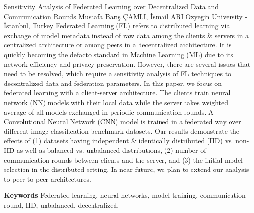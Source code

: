 
    \begin{abstract_online}{Sensitivity Analysis of Federated Learning over Decentralized Data and Communication Rounds}{%
        Mustafa Barış ÇAMLI, İsmail ARI}{%
        }{%
        Ozyegin University - İstanbul, Turkey}
    Federated Learning (FL) refers to distributed learning via exchange of model metadata instead of raw data among the clients & servers in a centralized architecture or among peers in a decentralized architecture. It is quickly becoming the defacto standard in Machine Learning (ML) due to its network efficiency and privacy-preservation. However, there are several issues that need to be resolved, which require a sensitivity analysis of FL techniques to decentralized data and federation parameters. In this paper, we focus on federated learning with a client-server architecture. The clients train neural network (NN) models with their local data while the server takes weighted average of all models exchanged in periodic communication rounds. A Convolutional Neural Network (CNN) model is trained in a federated way over different image classification benchmark datasets. Our results demonstrate the effects of (1) datasets having independent & identically distributed (IID) vs. non-IID as well as balanced vs. unbalanced distributions, (2) number of communication rounds between clients and the server, and (3) the initial model selection in the distributed setting. In near future, we plan to extend our analysis to peer-to-peer architectures. 
    
        \textbf{Keywords} \newline{}Federated learning, neural networks, model training, communication round, IID, unbalanced, decentralized.
    \end{abstract_online}
    